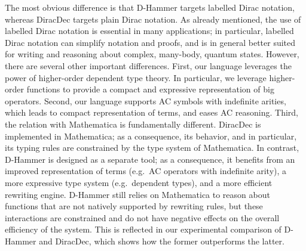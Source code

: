 The most obvious difference is that D-Hammer targets labelled Dirac
notation, whereas DiracDec targets plain Dirac notation. As already
mentioned, the use of labelled Dirac notation is essential in many
applications; in particular, labelled Dirac notation can simplify
notation and proofs, and is in general better suited for writing and
reasoning about complex, many-body, quantum states. However, there are
several other important differences. First, our language leverages the
power of higher-order dependent type theory. In particular, we
leverage higher-order functions to provide a compact and expressive
representation of big operators. Second, our language supports AC
symbols with indefinite arities, which leads to compact representation
of terms, and eases AC reasoning. Third, the relation with Mathematica
is fundamentally different. DiracDec is implemented in Mathematica; as
a consequence, its behavior, and in particular, its typing rules are
constrained by the type system of Mathematica. In contrast, D-Hammer
is designed as a separate tool; as a consequence, it benefits from an
improved representation of terms (e.g.\, AC operators with indefinite
arity), a more expressive type system (e.g.\, dependent types), and a
more efficient rewriting engine. D-Hammer still relies on Mathematica
to reason about functions that are not natively supported by rewriting
rules, but these interactions are constrained and do not have negative
effects on the overall efficiency of the system. This is reflected in
our experimental comparison of D-Hammer and DiracDec, which shows how
the former outperforms the latter.




